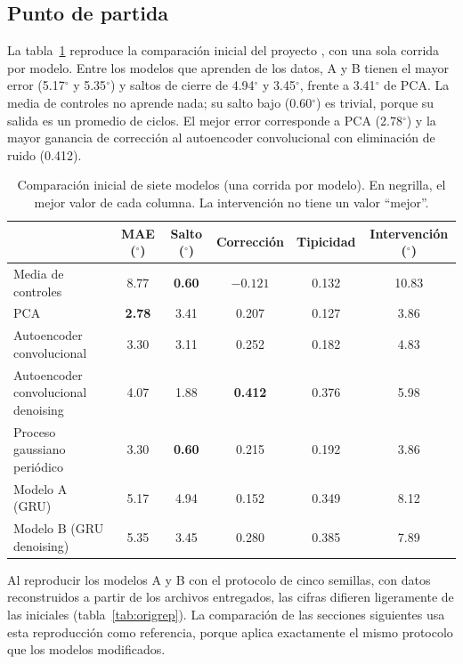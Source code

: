 \documentclass[11pt,a4paper]{amsart}
\newcommand{\gr}{$^{\circ}$}
\begin{document}
\subsection{Punto de partida}

La tabla~\ref{tab:inicial} reproduce la comparación inicial del proyecto \cite{neurostride2026}, con una sola corrida por modelo. Entre los modelos que aprenden de los datos, A y B tienen el mayor error (5.17\gr{} y 5.35\gr{}) y saltos de cierre de 4.94\gr{} y 3.45\gr{}, frente a 3.41\gr{} de PCA. La media de controles no aprende nada; su salto bajo (0.60\gr{}) es trivial, porque su salida es un promedio de ciclos. El mejor error corresponde a PCA (2.78\gr{}) y la mayor ganancia de corrección al autoencoder convolucional con eliminación de ruido (0.412).

\begin{table}[h]
\centering\small
\setlength{\tabcolsep}{4pt}
\begin{tabular}{lccccc}
\toprule
 & MAE (\gr) & Salto (\gr) & Corrección & Tipicidad & Intervención (\gr) \\
\midrule
Media de controles & 8.77 & \textbf{0.60} & $-0.121$ & 0.132 & 10.83 \\
PCA & \textbf{2.78} & 3.41 & 0.207 & 0.127 & 3.86 \\
Autoencoder convolucional & 3.30 & 3.11 & 0.252 & 0.182 & 4.83 \\
Autoencoder convolucional denoising & 4.07 & 1.88 & \textbf{0.412} & 0.376 & 5.98 \\
Proceso gaussiano periódico & 3.30 & \textbf{0.60} & 0.215 & 0.192 & 3.86 \\
Modelo A (GRU) & 5.17 & 4.94 & 0.152 & 0.349 & 8.12 \\
Modelo B (GRU denoising) & 5.35 & 3.45 & 0.280 & 0.385 & 7.89 \\
\bottomrule
\end{tabular}
\caption{Comparación inicial de siete modelos (una corrida por modelo). En negrilla, el mejor valor de cada columna. La intervención no tiene un valor ``mejor''.}
\label{tab:inicial}
\end{table}

Al reproducir los modelos A y B con el protocolo de cinco semillas, con datos reconstruidos a partir de los archivos entregados, las cifras difieren ligeramente de las iniciales (tabla~\ref{tab:origrep}). La comparación de las secciones siguientes usa esta reproducción como referencia, porque aplica exactamente el mismo protocolo que los modelos modificados.
\end{document}
